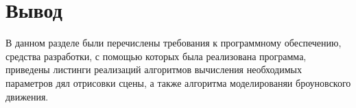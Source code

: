 \clearpage

\section*{Вывод}
В данном разделе были перечислены требования к программному обеспечению, средства разработки, с помощью которых была реализована программа, приведены листинги реализаций алгоритмов вычисления необходимых параметров дял отрисовки сцены, а также алгоритма моделированяи броуновского движения.


